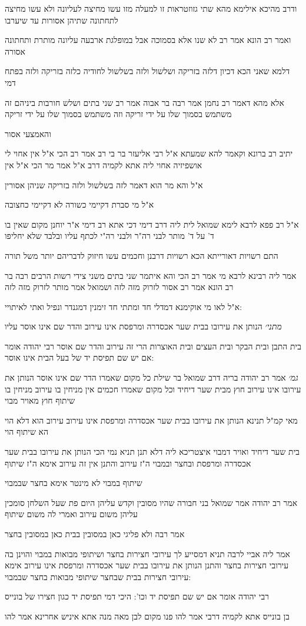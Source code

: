 \documentclass[12pt, openany]{book}
\newcommand{\sethebfont}{
\fontsize{10.5pt}{21.0pt} \selectfont
}
\newcommand{\textblock}[1]{
{\sethebfont #1\\}	
}
\begin{document}
\textblock{ודרב מהיכא אילימא מהא שתי גזוזטראות זו למעלה מזו עשו מחיצה לעליונה ולא עשו מחיצה לתחתונה שתיהן אסורות עד שיערבו}
\textblock{ואמר רב הונא אמר רב לא שנו אלא בסמוכה אבל במופלגת ארבעה עליונה מותרת ותחתונה אסורה}
\textblock{דלמא שאני הכא דכיון דלזה בזריקה ושלשול ולזה בשלשול לחודיה כלזה בזריקה ולזה בפתח דמי}
\textblock{אלא מהא דאמר רב נחמן אמר רבה בר אבוה אמר רב שני בתים ושלש חורבות ביניהם זה משתמש בסמוך שלו על ידי זריקה וזה משתמש בסמוך שלו על ידי זריקה}
\textblock{והאמצעי אסור}
\textblock{יתיב רב ברונא וקאמר להא שמעתא א"ל רבי אליעזר בר בי רב אמר רב הכי א"ל אין אחוי לי אושפיזיה אחוי ליה אתא לקמיה דרב א"ל אמר מר הכי א"ל אין}
\textblock{א"ל והא מר הוא דאמר לזה בשלשול ולזה בזריקה שניהן אסורין}
\textblock{א"ל מי סברת דקיימי כשורה לא דקיימי כחצובה }
\textblock{א"ל רב פפא לרבא לימא שמואל לית ליה דרב דימי דכי אתא רב דימי א"ר יוחנן מקום שאין בו ד' על ד' מותר לבני רה"ר ולבני רה"י לכתף עליו ובלבד שלא יחליפו}
\textblock{התם רשויות דאורייתא הכא רשויות דרבנן וחכמים עשו חיזוק לדבריהם יותר משל תורה}
\textblock{אמר ליה רבינא לרבא מי אמר רב הכי והא איתמר שני בתים משני צידי רשות הרבים רבה בר רב הונא אמר רב אסור לזרוק מזה לזה ושמואל אמר מותר לזרוק מזה לזה}
\textblock{א"ל לאו מי אוקימנא דמדלי חד ומתתי חד זימנין דמגנדר ונפיל ואתי לאיתויי:}
\textblock{{\large\emph{מתני׳}} הנותן את עירובו בבית שער אכסדרה ומרפסת אינו עירוב והדר שם אינו אוסר עליו}
\textblock{בית התבן ובית הבקר ובית העצים ובית האוצרות הרי זה עירוב והדר שם אוסר רבי יהודה אומר אם יש שם תפיסת יד של בעל הבית אינו אוסר:}
\textblock{{\large\emph{גמ׳}} אמר רב יהודה בריה דרב שמואל בר שילת כל מקום שאמרו הדר שם אינו אוסר הנותן את עירובו אינו עירוב חוץ מבית שער דיחיד וכל מקום שאמרו חכמים אין מניחין בו עירוב מניחין בו שיתוף חוץ מאויר מבוי}
\textblock{מאי קמ"ל תנינא הנותן את עירובו בבית שער אכסדרה ומרפסת אינו עירוב עירוב הוא דלא הוי הא שיתוף הוי}
\textblock{בית שער דיחיד ואויר דמבוי איצטריכא ליה דלא תנן תניא נמי הכי הנותן את עירובו בבית שער אכסדרה ומרפסת ובחצר ובמבוי ה"ז עירוב והתנן אין זה עירוב אימא ה"ז שיתוף}
\textblock{שיתוף במבוי לא מינטר אימא בחצר שבמבוי}
\textblock{אמר רב יהודה אמר שמואל בני חבורה שהיו מסובין וקדש עליהן היום פת שעל השלחן סומכין עליהן משום עירוב ואמרי לה משום שיתוף}
\textblock{אמר רבה ולא פליגי כאן במסובין בבית כאן במסובין בחצר}
\textblock{אמר ליה אביי לרבה תניא דמסייע לך עירובי חצירות בחצר ושיתופי מבואות במבוי והוינן בה עירובי חצירות בחצר והתנן הנותן את עירובו בבית שער אכסדרה ומרפסת אינו עירוב אימא עירובי חצירות בבית שבחצר שיתופי מבואות בחצר שבמבוי:}
\textblock{רבי יהודה אומר אם יש שם תפיסת יד וכו': היכי דמי תפיסת יד כגון חצירו של בונייס}
\textblock{בן בונייס אתא לקמיה דרבי אמר להו פנו מקום לבן מאה מנה אתא איניש אחרינא אמר להו}
\end{document}
